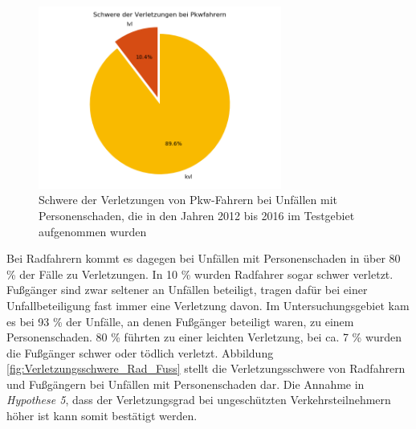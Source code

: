 \begin{savenotes}
	\begin{figure}[H]
		\centering
		\includegraphics[width=8cm,height=6cm]{figures/Verl_Pkw}
		\caption[Schwere der Verletzungen von Pkw-Fahrern bei Unfällen mit Personenschaden, die in den Jahren 2012 bis 2016 im Testgebiet aufgenommen wurden ]{Schwere der Verletzungen von Pkw-Fahrern bei Unfällen mit Personenschaden, die in den Jahren 2012 bis 2016 im Testgebiet aufgenommen wurden}\label{fig:Verletzungsschwere_Pkw}
	\end{figure}
\end{savenotes}

Bei Radfahrern kommt es dagegen bei Unfällen mit Personenschaden in über 80 \% der Fälle zu Verletzungen. In 10 \% wurden Radfahrer sogar schwer verletzt. Fußgänger sind zwar seltener an Unfällen beteiligt, tragen dafür bei einer Unfallbeteiligung fast immer eine Verletzung davon. Im Untersuchungsgebiet kam es bei 93 \% der Unfälle, an denen Fußgänger beteiligt waren, zu einem Personenschaden. 80 \% führten zu einer leichten Verletzung, bei ca. 7 \% wurden die Fußgänger schwer oder tödlich verletzt. Abbildung \ref{fig:Verletzungsschwere_Rad_Fuss} stellt die Verletzungsschwere von Radfahrern und Fußgängern bei Unfällen mit Personenschaden dar. Die Annahme in \textit{Hypothese 5}, dass der Verletzungsgrad bei ungeschützten Verkehrsteilnehmern höher ist kann somit bestätigt werden.

